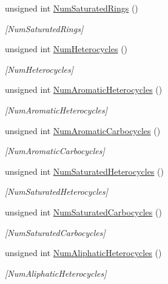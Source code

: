 \begin{DoxyCompactItemize}
unsigned int \mbox{\hyperlink{class_molecule_a0c4eb1ffb0cc048b22a8298e3a9bc951}{Num\+Saturated\+Rings}} ()
\begin{DoxyCompactList}\small\item\em \mbox{[}Num\+Saturated\+Rings\mbox{]} \end{DoxyCompactList}\item 
unsigned int \mbox{\hyperlink{class_molecule_a9ea5ea968d6b3712d059b33fcd860c94}{Num\+Heterocycles}} ()
\begin{DoxyCompactList}\small\item\em \mbox{[}Num\+Heterocycles\mbox{]} \end{DoxyCompactList}\item 
unsigned int \mbox{\hyperlink{class_molecule_acacbd3d2e5fc65157be32f14ef98f15d}{Num\+Aromatic\+Heterocycles}} ()
\begin{DoxyCompactList}\small\item\em \mbox{[}Num\+Aromatic\+Heterocycles\mbox{]} \end{DoxyCompactList}\item 
unsigned int \mbox{\hyperlink{class_molecule_af0be542ca2e2d7d137d80dc0fdc7d6ec}{Num\+Aromatic\+Carbocycles}} ()
\begin{DoxyCompactList}\small\item\em \mbox{[}Num\+Aromatic\+Carbocycles\mbox{]} \end{DoxyCompactList}\item 
unsigned int \mbox{\hyperlink{class_molecule_a9121b878bee7059c7f3eabb541e3c029}{Num\+Saturated\+Heterocycles}} ()
\begin{DoxyCompactList}\small\item\em \mbox{[}Num\+Saturated\+Heterocycles\mbox{]} \end{DoxyCompactList}\item 
unsigned int \mbox{\hyperlink{class_molecule_a63f6f6403e648006f25feb9103add3ce}{Num\+Saturated\+Carbocycles}} ()
\begin{DoxyCompactList}\small\item\em \mbox{[}Num\+Saturated\+Carbocycles\mbox{]} \end{DoxyCompactList}\item 
unsigned int \mbox{\hyperlink{class_molecule_a9c5af0a753b98601782bb2d98021793a}{Num\+Aliphatic\+Heterocycles}} ()
\begin{DoxyCompactList}\small\item\em \mbox{[}Num\+Aliphatic\+Heterocycles\mbox{]} \end{DoxyCompactList}\item 

\end{DoxyCompactItemize}
